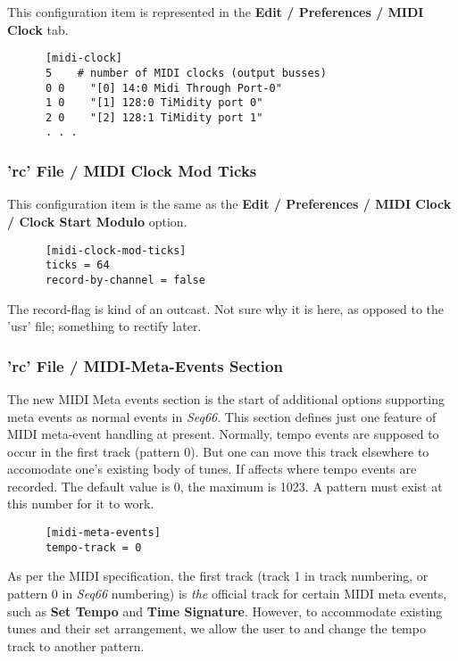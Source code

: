    This configuration item is represented in the
   \textbf{Edit / Preferences / MIDI Clock} tab.

   \begin{verbatim}
      [midi-clock]
      5    # number of MIDI clocks (output busses)
      0 0    "[0] 14:0 Midi Through Port-0"
      1 0    "[1] 128:0 TiMidity port 0"
      2 0    "[2] 128:1 TiMidity port 1"
      . . .
   \end{verbatim}

\subsubsection{'rc' File / MIDI Clock Mod Ticks}
\label{subsubsec:configuration_rc_midi_cmt}

   This configuration item is the same as the
   \textbf{Edit / Preferences / MIDI Clock / Clock Start Modulo} option.

   \begin{verbatim}
      [midi-clock-mod-ticks]
      ticks = 64
      record-by-channel = false
   \end{verbatim}

   The record-flag is kind of an outcast.  Not sure why it is here, as
   opposed to the 'usr' file;
   something to rectify later.

\subsubsection{'rc' File / MIDI-Meta-Events Section}
\label{subsubsec:configuration_rc_midi_meta_events}

   The new MIDI Meta events section is the start of additional options
   supporting meta events as normal events in \textsl{Seq66}.
   This section defines just one feature of MIDI meta-event handling at present.
   Normally, tempo events are supposed to occur in the first track (pattern 0).
   But one can move this track elsewhere to accomodate one's existing body of
   tunes.  If affects where tempo events are recorded.  The default value is 0,
   the maximum is 1023.  A pattern must exist at this number for it to work.

   \begin{verbatim}
      [midi-meta-events]
      tempo-track = 0
   \end{verbatim}

   As per the MIDI specification, the first track (track 1 in track
   numbering, or pattern 0 in \textsl{Seq66} numbering) is \textsl{the}
   official track for certain MIDI meta events, such as
   \textbf{Set Tempo} and
   \textbf{Time Signature}.
   However, to accommodate existing tunes and their set
   arrangement, we allow the user to
   and change the tempo track to another pattern.

